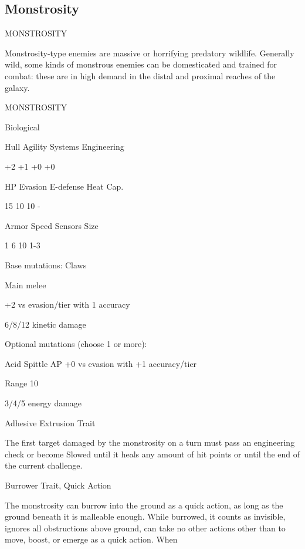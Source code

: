 \subsection{Monstrosity}
                                           MONSTROSITY  

Monstrosity-type enemies are massive or horrifying predatory wildlife. Generally wild, some kinds  
of monstrous enemies can be domesticated and trained for combat: these are in high demand in  
the distal and proximal reaches of the galaxy. 
 

       MONSTROSITY 

       Biological 

       Hull       Agility      Systems       Engineering 

       +2         +1           +0            +0 

       HP         Evasion      E-defense     Heat Cap. 

       15         10           10            - 

       Armor      Speed        Sensors       Size 

       1          6            10            1-3 

Base mutations:  
Claws
 
Main melee
 
+2 vs evasion/tier with 1 accuracy
 
6/8/12 kinetic damage
 

Optional mutations (choose 1 or more):
 

Acid Spittle  
AP  
+0 vs evasion with +1 accuracy/tier
 
Range 10
 
3/4/5 energy damage
 

Adhesive Extrusion  
Trait
 
The first target damaged by the monstrosity on a turn must pass an engineering check or  
become Slowed until it heals any amount of hit points or until the end of the current challenge.
 

Burrower  
Trait, Quick Action
 
The monstrosity can burrow into the ground as a quick action, as long as the ground beneath it  
is malleable enough. While burrowed, it counts as invisible, ignores all obstructions above  
ground, can take no other actions other than to move, boost, or emerge as a quick action. When  

                                                                                                           


